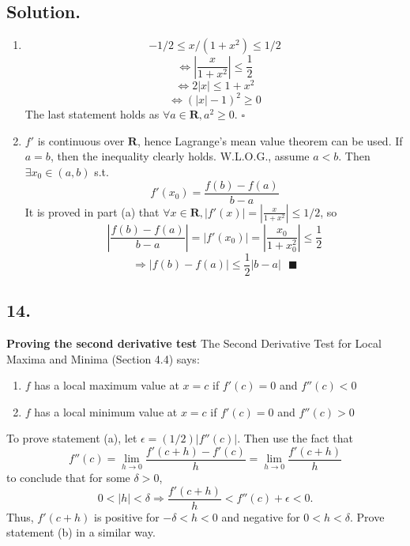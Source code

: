 \documentclass{article}
\begin{document}
\subsection*{Solution.}
\begin{enumerate}[label=\textbf{\alph*.}]
    \item \[-1/2\leq x/(1+x^2)\leq 1/2\]
    \[\Leftrightarrow \left|\frac{x}{1+x^2}\right|\leq\frac{1}{2}\]
    \[\Leftrightarrow 2|x|\leq 1+x^2\]
    \[\Leftrightarrow (|x|-1)^2\geq 0\]
    The last statement holds as $\forall a\in\mathbf{R},a^2\geq 0$.  $\square$
    \item $f'$ is continuous over $\mathbf{R}$, hence Lagrange's mean value theorem can be used.\newline
    If $a=b$, then the inequality clearly holds.
    W.L.O.G., assume $a<b$.
    Then $\exists x_0\in (a,b)$ s.t. 
    \[f'(x_0)=\frac{f(b)-f(a)}{b-a}\]
    It is proved in part (a) that $\forall x\in \mathbf{R}, |f'(x)|=\left|\frac{x}{1+x^2}\right|\leq 1/2$, so
    \[\left|\frac{f(b)-f(a)}{b-a}\right|=|f'(x_0)|=\left|\frac{x_0}{1+x_0^2}\right|\leq \frac{1}{2}\]
    \[\Rightarrow |f(b)-f(a)|\leq \frac{1}{2}|b-a|\text{   }\blacksquare\]
\end{enumerate}
    
\subsection*{14.}
\textbf{Proving the second derivative test  } The Second Derivative Test for Local Maxima and Minima (Section 4.4) says:
\begin{enumerate} [label=\textbf{\alph*.}]
    \item $f$ has a local maximum value at $x=c$ if $f'(c)=0$ and $f''(c)<0$
    \item $f$ has a local minimum value at $x=c$ if $f'(c)=0$ and $f''(c)>0$
\end{enumerate}
To prove statement (a), let $\epsilon=(1/2)|f''(c)|$. Then use the fact that 
\[f''(c)=\lim_{h\to 0}\frac{f'(c+h)-f'(c)}{h}=\lim_{h\to 0} \frac{f'(c+h)}{h}\]
to conclude that for some $\delta>0$,\
\[0<|h|<\delta \Rightarrow \frac{f'(c+h)}{h}<f''(c)+\epsilon<0.\]
Thus, $f'(c+h)$ is positive for $-\delta<h<0$ and negative for $0<h<\delta$. Prove statement (b) in a similar way.
\end{document}
